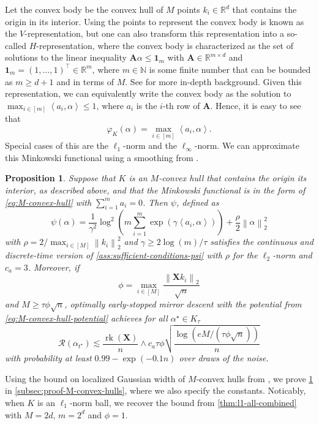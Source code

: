 \documentclass[a4paper]{article}
\newcommand{\pr}[1]{\left(#1\right)}
\newcommand{\norm}[1]{\left\|#1\right\|}
\newcommand{\inner}[2]{\left\langle #1,#2\right\rangle}
\newcommand{\A}[0]{\mathbf{A}}
\newcommand{\X}[0]{\mathbf{X}}
\newcommand{\NN}[0]{\mathbb{N}}
\newcommand{\RR}[0]{\mathbb{R}}
\newcommand{\cR}[0]{\mathcal{R}}
\newcommand{\alphastar}{\alpha^\star}
\newcommand{\alphatstar}[0]{\alpha_{t^\star}}
\newcommand{\Kt}[0]{K_\tau}
\DeclareMathOperator{\rankOp}{rk}
\newcommand{\rank}[1]{\rankOp\pr{#1}}
\newcommand{\ind}[0]{\mathbf{1}}
\theoremstyle{thmstyle}
\newtheorem{proposition}[theorem]{Proposition}
\theoremstyle{defstyle}
\theoremstyle{remark}
\begin{document}
Let the convex body be the convex hull of $M$ points $k_i\in \RR^d$ that contains the origin in its interior. Using the points to represent the convex body is known as the $V$-representation, but one can also transform this representation into a so-called $H$-representation, where the convex body is characterized as the set of solutions to the linear inequality $\A \alpha \leq \ind_{m}$ with $\A\in \RR^{m\times d}$ and $\ind_m=(1,\dots,1)^\top\in \RR^m$, where $m\in\NN$ is some finite number that can be bounded as $m\geq d+1$ and in terms of $M$. See \cite{Schrijver1998theory} for more in-depth background. Given this representation, we can equivalently write the convex body as the solution to $\max_{i\in [m]}\inner{a_i}{\alpha}\leq 1$, where $a_i$ is the $i$-th row of $\A$.
Hence, it is easy to see that 
\begin{equation}
\label{eq:M-convex-hull}
     \varphi_K(\alpha)=\max_{i\in [m]}\inner{a_i}{\alpha}.
\end{equation}
Special cases of this are the $\ell_1$-norm and the $\ell_\infty$-norm.
We can approximate this Minkowski functional using a smoothing from \cite[Example 4.5]{Beck2012smoothing}.
\begin{proposition}
\label{prop:M-convex-hulls}
    Suppose that $K$ is an $M$-convex hull that contains the origin its interior, as described above, and that the Minkowski functional is in the form of \eqref{eq:M-convex-hull} with $\sum_{i=1}^m a_i = 0$. Then $\psi$, defined as
    \begin{equation}
    \label{eq:M-convex-hull-potential}
        \psi(\alpha)=\frac{1}{\gamma^2}\log^2\pr{m\sum_{i=1}^m \exp(\gamma \inner{a_i}{\alpha})}+\frac{\rho}{2}\norm{\alpha}_2^2
    \end{equation}
    with $\rho = 2/ \max_{i\in [M]} \norm{k_i}_2^2$ and $\gamma \geq 2\log (m)/\tau$ satisfies the continuous and discrete-time version of \cref{ass:sufficient-conditions-psi} with $\rho$ for the $\ell_2$-norm and $c_a=3$. Moreover, if 
    $$\phi=\max_{i\in[M]} \frac{\norm{\X k_i}_2}{\sqrt{n}}$$ and $M\geq \tau \phi \sqrt{n}$, optimally early-stopped mirror descent with the potential from \eqref{eq:M-convex-hull-potential} achieves for all $\alphastar\in \Kt$
    \begin{equation*}
        \cR(\alphatstar)\lesssim \frac{\rank{\X}}{n}\wedge c_a \tau \phi  \sqrt{\frac{\log\pr{eM/(\tau\phi \sqrt{n})}}{n}}
    \end{equation*}
    with probability at least $0.99-\exp\pr{-0.1n}$ over draws of the noise.
\end{proposition}
\noindent Using the bound on localized Gaussian width of $M$-convex hulls from \cite{Bellec2017localizedgaussianwidthmconvex}, we prove \cref{prop:M-convex-hulls} in \cref{subsec:proof-M-convex-hulls}, where we also specify the constants.
Noticably, when $K$ is an $\ell_1$-norm ball, we recover the bound from \cref{thm:l1-all-combined} with $M=2d$, $m=2^d$ and $\phi = 1$.
\end{document}
